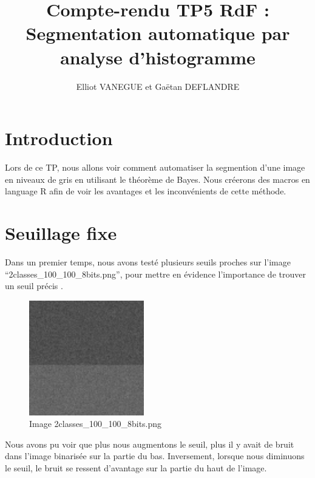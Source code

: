 \documentclass[a4paper,11pt]{article}
\title{Compte-rendu TP5 RdF : Segmentation automatique par analyse d’histogramme}
\author{Elliot VANEGUE et Gaëtan DEFLANDRE}
\begin{document}


  \maketitle
  
  \mbox{}
  \newpage
  \clearpage
  
  \section*{Introduction}
  
  Lors de ce TP, nous allons voir comment automatiser la segmention d'une image en niveaux de gris en 
  utilisant le théorème de Bayes. Nous créerons des macros en language R 
  afin de voir les avantages et les inconvénients de cette méthode.

  \section{Seuillage fixe}
   
  Dans un premier temps, nous avons testé plusieurs seuils proches sur l'image \\
  \enquote{2classes\_100\_100\_8bits.png}, pour mettre en évidence l'importance de trouver un seuil précis .\\
  
  \begin{figure}[H]
    \center
    \includegraphics[width=5cm]{2classes_100_100_8bits.png}
    \caption{Image 2classes\_100\_100\_8bits.png}
  \end{figure}
  Nous avons pu voir que plus nous augmentons le seuil, plus il y avait de bruit dans l'image
  binarisée sur la partie du bas. Inversement, lorsque nous diminuons le seuil, le bruit 
  se ressent d'avantage sur la partie du haut de l'image.\\
  
\end{document}
